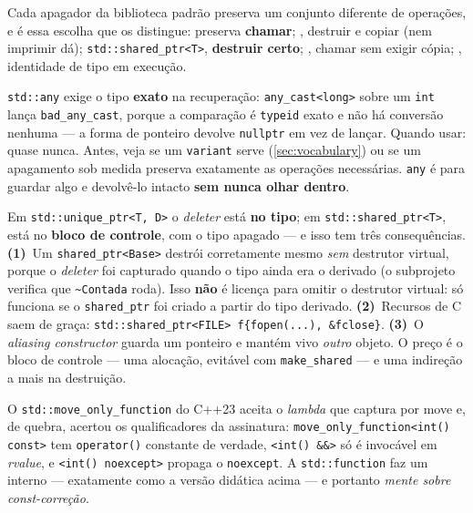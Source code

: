 Cada apagador da biblioteca padrão preserva um conjunto diferente de operações,
e é essa escolha que os distingue:  preserva
\textbf{chamar}; , destruir e copiar (nem imprimir dá);
\texttt{std::shared\_ptr<T>}, \textbf{destruir certo};
, chamar sem exigir cópia;
, identidade de tipo em execução.

\texttt{std::any} exige o tipo \textbf{exato} na recuperação:
\texttt{any\_cast<long>} sobre um \texttt{int} lança \texttt{bad\_any\_cast},
porque a comparação é \texttt{typeid} exato e não há conversão nenhuma --- a
forma de ponteiro devolve \texttt{nullptr} em vez de lançar. Quando usar: quase
nunca. Antes, veja se um \texttt{variant} serve (\cref{sec:vocabulary}) ou se um
apagamento sob medida preserva exatamente as operações necessárias. \texttt{any}
é para guardar algo e devolvê-lo intacto \textbf{sem nunca olhar dentro}.

\begin{armadilha}
Em \texttt{std::unique\_ptr<T, D>} o \emph{deleter} está \textbf{no tipo}; em
\texttt{std::shared\_ptr<T>}, está no \textbf{bloco de controle}, com o tipo
apagado --- e isso tem três consequências. \textbf{(1)}~Um
\texttt{shared\_ptr<Base>} destrói corretamente mesmo \emph{sem} destrutor
virtual, porque o \emph{deleter} foi capturado quando o tipo ainda era o
derivado (o subprojeto verifica que \texttt{\textasciitilde Contada} roda). Isso
\textbf{não} é licença para omitir o destrutor virtual: só funciona se o
\texttt{shared\_ptr} foi criado a partir do tipo derivado.
\textbf{(2)}~Recursos de C saem de graça:
\texttt{std::shared\_ptr<FILE> f\{fopen(...), \&fclose\}}.
\textbf{(3)}~O \emph{aliasing constructor} guarda um ponteiro e mantém vivo
\emph{outro} objeto. O preço é o bloco de controle --- uma alocação, evitável
com \texttt{make\_shared} --- e uma indireção a mais na destruição.
\end{armadilha}

O \texttt{std::move\_only\_function} do C++23 aceita o \emph{lambda} que captura
por \gls{move} e, de quebra, acertou os qualificadores da assinatura:
\texttt{move\_only\_function<int() const>} tem \texttt{operator()} constante de
verdade, \texttt{<int() \&\&>} só é invocável em \emph{rvalue}, e
\texttt{<int() noexcept>} propaga o \texttt{noexcept}. A
\texttt{std::function} faz um  interno --- exatamente como a
versão didática acima --- e portanto \emph{mente sobre const-correção}.

